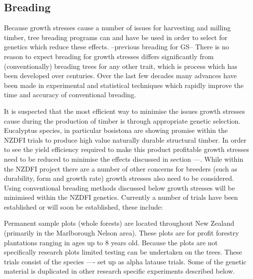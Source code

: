 \documentclass{article}
\begin{document}
\subsection{Breading}
Because growth stresses cause a number of issues for harvesting and milling
timber, tree breading programs can and have be used in order to select for
genetics which reduce these effects. --previous breading for GS-- There is no reason to
expect  breading for growth stresses differs significantly from (conventionally)
breading trees for any other trait, which is process which has been developed
over centuries. Over the last few decades many advances have been made in
experimental and statistical techniques which rapidly improve the time and
accuracy of conventional breading.

It is suspected that the most efficient way to minimise the issues growth
stresses cause during the production of timber is through appropriate genetic
selection. Eucalyptus species, in particular bosistona are showing promise
within the NZDFI trials to produce high value naturally durable structural
timber. In order to see the yield efficiency required to make this
product profitable growth stresses need to be reduced to minimise the
effects discussed in section ---. While within the NZDFI project there are a
number of other concerns for breeders (such as durability, form and growth
rate) growth stresses also need to be considered. Using conventional breading
methods discussed below growth stresses will be minimised within the NZDFI
genetics. Currently a number of trials have been established or will soon be
established, these include:

Permanent sample plots (whole forests) are located throughout New Zealand
(primarily in the Marlborough Nelson area).
These plots are for profit forestry plantations ranging in ages up to 8 years
old.
Because the plots are not specifically research plots limited testing can be
undertaken on the trees. These trials consist of the species ---- set up as
alpha latause trials. Some of the genetic material is duplicated in other
research specific experiments described below.
\end{document}

